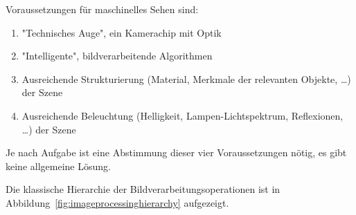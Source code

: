 			Voraussetzungen für maschinelles Sehen sind:
			\begin{enumerate}
				\item "Technisches Auge", \dh ein Kamerachip mit Optik
				\item "Intelligente", bildverarbeitende Algorithmen
				\item Ausreichende Strukturierung (Material, Merkmale der relevanten Objekte, \dots) der Szene
				\item Ausreichende Beleuchtung (Helligkeit, Lampen-Lichtspektrum, Reflexionen, \dots) der Szene
			\end{enumerate}
			Je nach Aufgabe ist eine Abstimmung dieser vier Voraussetzungen nötig, \dh es gibt keine allgemeine Lösung.
			
			Die klassische Hierarchie der Bildverarbeitungsoperationen ist in Abbildung~\ref{fig:imageprocessinghierarchy} aufgezeigt.
			
